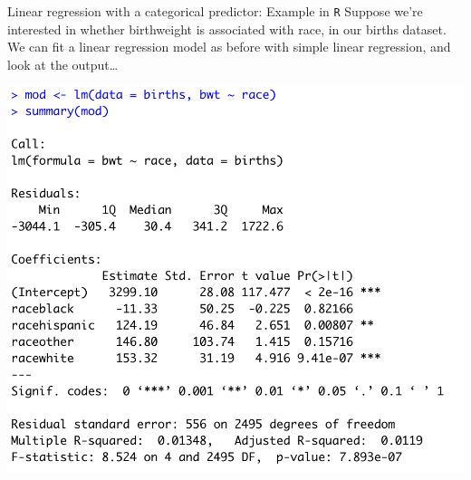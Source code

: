 \documentclass[10pt,t]{beamer}
\begin{document}
\begin{frame}{Linear regression with a categorical predictor: Example in \texttt{R}}
Suppose we're interested in whether birthweight is associated with race, in our births dataset. We can fit a linear regression model as before with simple linear regression, and look at the output\dots

\vspace{0.3cm}

\centering

\includegraphics[scale=0.4]{multilevel_cat_lm.png}

\end{frame}
\end{document}
